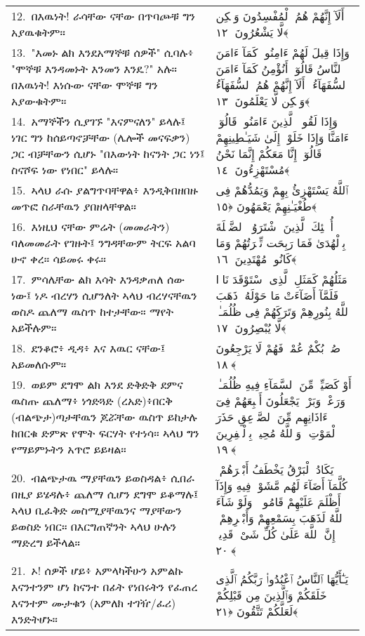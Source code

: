 \documentclass[11pt,a4paper,oneside]{article}%
\newcommand{\mytextarabic}[1]{\textarabic{ #1 \flushright}}
\begin{document}
\begin{longtable}{%
  @{}
    p{}
  @{~~~}
    p{}
    @{}
}
12.\ በእዉነት! ራሳቸው ናቸው በጥባጮቹ ግን አያዉቁትም። &  \mytextarabic{أَلَآ إِنَّهُمْ هُمُ ٱلْمُفْسِدُونَ وَلَٟكِن لَّا يَشْعُرُونَ ﴿١٢﴾} \\
13.\ "እመኑ ልክ እንደአማኞቹ ሰዎች" ሲባሉ፥ "ሞኞቹ እንዳመኑት እንመን እንዴ?" አሉ። በእዉነት! እነሱው ናቸው ሞኞቹ ግን አያውቁትም። &  \mytextarabic{وَإِذَا قِيلَ لَهُمْ ءَامِنُوا۟ كَمَآ ءَامَنَ ٱلنَّاسُ قَالُوٓا۟ أَنُؤْمِنُ كَمَآ ءَامَنَ ٱلسُّفَهَآءُ ۗ أَلَآ إِنَّهُمْ هُمُ ٱلسُّفَهَآءُ وَلَٟكِن لَّا يَعْلَمُونَ ﴿١٣﴾}   \\
14.\ አማኞችን ሲያገኙ "እናምናለን" ይላሉ፤ ነገር ግን ከሰይጣኖቻቸው (ሌሎች መናፍቃን) ጋር ብቻቸውን ሲሆኑ "በእውነት ከናንት ጋር ነን፤ ስናሾፍ ነው የነበር" ይላሉ። &  \mytextarabic{وَإِذَا لَقُوا۟ ٱلَّذِينَ ءَامَنُوا۟ قَالُوٓا۟ ءَامَنَّا وَإِذَا خَلَوْا۟ إِلَىٰ شَيَـٰطِينِهِمْ قَالُوٓا۟ إِنَّا مَعَكُمْ إِنَّمَا نَحْنُ مُسْتَهْزِءُونَ ﴿١٤﴾} \\
15.\ ኣላህ ራሱ ያልግጥባቸዋል፥ እንዲቅበዘበዙ መጥፎ ስራቸዉን ያበዘላቸዋል። &  \mytextarabic{ٱللَّهُ يَسْتَهْزِئُ بِهِمْ وَيَمُدُّهُمْ فِى طُغْيَـٰنِهِمْ يَعْمَهُونَ ﴿١٥﴾}\\ 
16.\ እነዚህ ናቸው ምሬት (መመራትን) ባለመመራት የገዙት፤ ንግዳቸውም ትርፍ አልባ ሁኖ ቀረ። ሳይመሩ ቀሩ። &  \mytextarabic{أُو۟لَٟٓئِكَ ٱلَّذِينَ ٱشْتَرَوُا۟ ٱلضَّلَٟلَةَ بِٱلْهُدَىٰ فَمَا رَبِحَت تِّجَٟرَتُهُمْ وَمَا كَانُوا۟ مُهْتَدِينَ ﴿١٦﴾} \\
17.\ ምሳሌቸው ልክ እሳት እንዳቃጠለ ሰው ነው፤ ነዶ ብረሃን ሲሆንለት ኣላህ ብረሃናቸዉን ወስዶ ጨለማ ዉስጥ ከተታቸው። ማየት  አይችሉም።
&  \mytextarabic{ مَثَلُهُمْ كَمَثَلِ ٱلَّذِى ٱسْتَوْقَدَ نَارًۭا فَلَمَّآ أَضَآءَتْ مَا حَوْلَهُۥ ذَهَبَ ٱللَّهُ بِنُورِهِمْ وَتَرَكَهُمْ فِى ظُلُمَـٰتٍۢ لَّا يُبْصِرُونَ ﴿١٧﴾}\\ 
18.\ ደንቆሮ፥ ዲዳ፥ እና እዉር ናቸው፤  አይመለሱም።  &  \mytextarabic{ صُمٌّۢ بُكْمٌ عُمْىٌۭ فَهُمْ لَا يَرْجِعُونَ ﴿١٨﴾}\\
19.\ ወይም ደግሞ ልክ እንደ ድቅድቅ ደምና  ዉስጡ ጨለማ፥ ነጎድጓድ (ረአድ)፥በርቅ  (ብልጭታ)ጣታቸዉን ጆሯቸው ዉስጥ  ይከታሉ ከበርቁ ድምጽ የሞት ፍርሃት የተነሳ።  ኣላህ ግን የማይምኑትን አጥሮ ይይዛል። &  \mytextarabic{ أَوْ كَصَيِّبٍۢ مِّنَ ٱلسَّمَآءِ فِيهِ ظُلُمَـٰتٌۭ وَرَعْدٌۭ وَبَرْقٌۭ يَجْعَلُونَ أَصَٟبِعَهُمْ فِىٓ ءَاذَانِهِم مِّنَ ٱلصَّوَٟعِقِ حَذَرَ ٱلْمَوْتِ ۚ وَٱللَّهُ مُحِيطٌۢ بِٱلْكَٟفِرِينَ ﴿١٩﴾}\\
20.\ ብልጭታዉ ማያቸዉን ይወስዳል፥ ሲበራ በዚያ ይሄዳሉ፥ ጨለማ ሲሆን ደግሞ ይቆማሉ፤ ኣላህ ቢፈቅድ መስሚያቸዉንና ማያቸውን ይወስድ ነበር። በእርግጠኛንት ኣላህ ሁሉን ማድረግ ይችላል። &  \mytextarabic{يَكَادُ ٱلْبَرْقُ يَخْطَفُ أَبْصَٟرَهُمْ ۖ كُلَّمَآ أَضَآءَ لَهُم مَّشَوْا۟ فِيهِ وَإِذَآ أَظْلَمَ عَلَيْهِمْ قَامُوا۟ ۚ وَلَوْ شَآءَ ٱللَّهُ لَذَهَبَ بِسَمْعِهِمْ وَأَبْصَٟرِهِمْ ۚ إِنَّ ٱللَّهَ عَلَىٰ كُلِّ شَىْءٍۢ قَدِيرٌۭ ﴿٢٠﴾}\\
21.\ ኦ! ሰዎች ሆይ፥ አምላካችሁን አምልኩ እናንተንም ሆነ ከናንተ በፊት የነበሩትን የፈጠረ እናንተም ሙታቁን (አምለክ ተገዥ/ፈሪ) እንድትሆኑ። &  \mytextarabic{يَـٰٓأَيُّهَا ٱلنَّاسُ ٱعْبُدُوا۟ رَبَّكُمُ ٱلَّذِى خَلَقَكُمْ وَٱلَّذِينَ مِن قَبْلِكُمْ لَعَلَّكُمْ تَتَّقُونَ ﴿٢١﴾}\\

\end{longtable}
\end{document}

